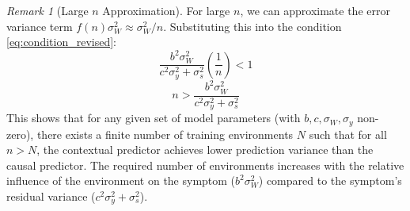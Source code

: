 \documentclass{article}
\theoremstyle{plain}
\theoremstyle{definition}
\theoremstyle{remark}
\newtheorem{remark}{Remark}[section]
\begin{document}
\begin{remark}[Large $n$ Approximation]
For large $n$, we can approximate the error variance term $f(n) \sigma_W^2 \approx \sigma_W^2/n$. Substituting this into the condition \eqref{eq:condition_revised}:
\[ \frac{b^2 \sigma_W^2}{c^2\sigma_y^2 + \sigma_s^2} \left( \frac{1}{n} \right) < 1 \]
\[ n > \frac{b^2 \sigma_W^2}{c^2\sigma_y^2 + \sigma_s^2} \]
This shows that for any given set of model parameters (with $b, c, \sigma_W, \sigma_y$ non-zero), there exists a finite number of training environments $N$ such that for all $n > N$, the contextual predictor achieves lower prediction variance than the causal predictor. The required number of environments increases with the relative influence of the environment on the symptom ($b^2 \sigma_W^2$) compared to the symptom's residual variance ($c^2\sigma_y^2 + \sigma_s^2$).
\end{remark}
\end{document}
